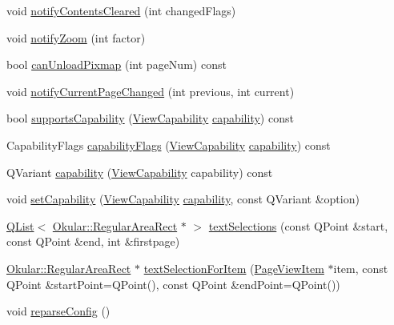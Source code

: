 \begin{DoxyCompactItemize}
\item 
void \hyperlink{classPageView_a85d5c9030f5f5f0e85b8fdb981de81e9}{notify\+Contents\+Cleared} (int changed\+Flags)
\item 
void \hyperlink{classPageView_a6a9498322af52740ea85fcb89a9eb4f8}{notify\+Zoom} (int factor)
\item 
bool \hyperlink{classPageView_aaacf2a76b80572d853d96a94d98a4b89}{can\+Unload\+Pixmap} (int page\+Num) const 
\item 
void \hyperlink{classPageView_aed6c4bd9e667099fcfdb28ba3ed7be33}{notify\+Current\+Page\+Changed} (int previous, int current)
\item 
bool \hyperlink{classPageView_ad874758e1b8305ad1aeab986d1d2513c}{supports\+Capability} (\hyperlink{classOkular_1_1View_ad95d365554715eb1eabb79350f51b294}{View\+Capability} \hyperlink{classPageView_a2a3eb80b924b29dd1498259734f81311}{capability}) const 
\item 
Capability\+Flags \hyperlink{classPageView_afb9281a41f591a04ffb96e4d7e1fe67e}{capability\+Flags} (\hyperlink{classOkular_1_1View_ad95d365554715eb1eabb79350f51b294}{View\+Capability} \hyperlink{classPageView_a2a3eb80b924b29dd1498259734f81311}{capability}) const 
\item 
Q\+Variant \hyperlink{classPageView_a2a3eb80b924b29dd1498259734f81311}{capability} (\hyperlink{classOkular_1_1View_ad95d365554715eb1eabb79350f51b294}{View\+Capability} capability) const 
\item 
void \hyperlink{classPageView_aad3b63508df30a6bc2ecbe587353c6b6}{set\+Capability} (\hyperlink{classOkular_1_1View_ad95d365554715eb1eabb79350f51b294}{View\+Capability} \hyperlink{classPageView_a2a3eb80b924b29dd1498259734f81311}{capability}, const Q\+Variant \&option)
\item 
\hyperlink{classQList}{Q\+List}$<$ \hyperlink{classOkular_1_1RegularAreaRect}{Okular\+::\+Regular\+Area\+Rect} $\ast$ $>$ \hyperlink{classPageView_a741402cbb905eb81f49f7842a38ab3dc}{text\+Selections} (const Q\+Point \&start, const Q\+Point \&end, int \&firstpage)
\item 
\hyperlink{classOkular_1_1RegularAreaRect}{Okular\+::\+Regular\+Area\+Rect} $\ast$ \hyperlink{classPageView_ace30a37c79e7cd9b523a6cd4fd74f5ae}{text\+Selection\+For\+Item} (\hyperlink{classPageViewItem}{Page\+View\+Item} $\ast$item, const Q\+Point \&start\+Point=Q\+Point(), const Q\+Point \&end\+Point=Q\+Point())
\item 
void \hyperlink{classPageView_a82bbd6a6b843d5b43ec06a0f76d7ae34}{reparse\+Config} ()
\item 

\end{DoxyCompactItemize}
